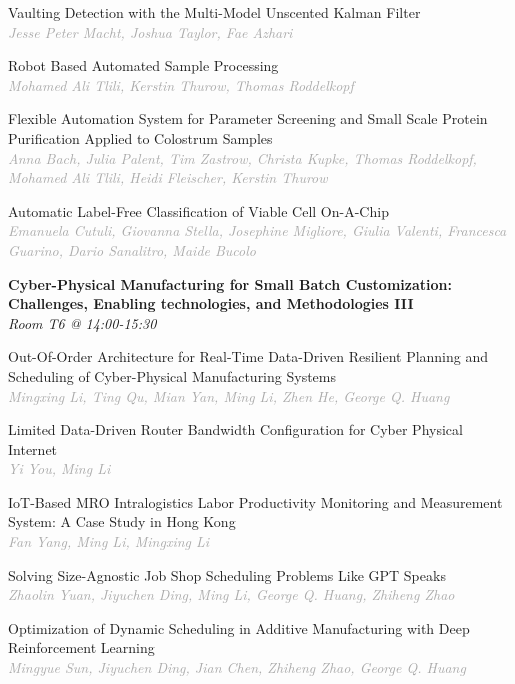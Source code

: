\begin{multicols*}{2}
\small Vaulting Detection with the Multi-Model Unscented Kalman Filter\\ 
\footnotesize \textcolor{darkgray}{\textit{Jesse Peter Macht, Joshua  Taylor, Fae  Azhari}}

\small Robot Based Automated Sample Processing\\ 
\footnotesize \textcolor{darkgray}{\textit{Mohamed Ali Tlili, Kerstin  Thurow, Thomas  Roddelkopf}}

\small Flexible Automation System for Parameter Screening and Small Scale Protein Purification Applied to Colostrum Samples\\ 
\footnotesize \textcolor{darkgray}{\textit{Anna Bach, Julia  Palent, Tim  Zastrow, Christa  Kupke, Thomas  Roddelkopf, Mohamed Ali  Tlili, Heidi  Fleischer, Kerstin  Thurow}}

\small Automatic Label-Free Classification of Viable Cell On-A-Chip\\ 
\footnotesize \textcolor{darkgray}{\textit{Emanuela Cutuli, Giovanna  Stella, Josephine  Migliore, Giulia  Valenti, Francesca  Guarino, Dario  Sanalitro, Maide  Bucolo}}

\normalsize \textbf{Cyber-Physical Manufacturing for Small Batch Customization: Challenges, Enabling technologies, and Methodologies III}\\
\small \textit{Room T6 @ 14:00-15:30}

\small Out-Of-Order Architecture for Real-Time Data-Driven Resilient Planning and Scheduling of Cyber-Physical Manufacturing Systems\\ 
\footnotesize \textcolor{darkgray}{\textit{Mingxing Li, Ting  Qu, Mian  Yan, Ming  Li, Zhen  He, George Q.  Huang}}

\small Limited Data-Driven Router Bandwidth Configuration for Cyber Physical Internet\\ 
\footnotesize \textcolor{darkgray}{\textit{Yi You, Ming  Li}}

\small IoT-Based MRO Intralogistics Labor Productivity Monitoring and Measurement System: A Case Study in Hong Kong\\ 
\footnotesize \textcolor{darkgray}{\textit{Fan Yang, Ming  Li, Mingxing  Li}}

\small Solving Size-Agnostic Job Shop Scheduling Problems Like GPT Speaks\\ 
\footnotesize \textcolor{darkgray}{\textit{Zhaolin Yuan, Jiyuchen  Ding, Ming  Li, George Q.  Huang, Zhiheng  Zhao}}

\small Optimization of Dynamic Scheduling in Additive Manufacturing with Deep Reinforcement Learning\\ 
\footnotesize \textcolor{darkgray}{\textit{Mingyue Sun, Jiyuchen  Ding, Jian  Chen, Zhiheng  Zhao, George Q.  Huang}}


\end{multicols*}

